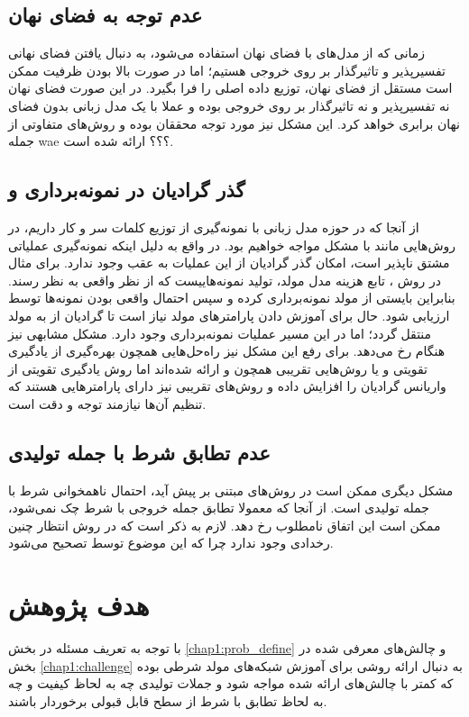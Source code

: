  \subsection{عدم توجه به فضای نهان}
 زمانی که از مدل‌های با فضای نهان استفاده می‌شود، به دنبال یافتن فضای نهانی تفسیرپذیر و تاثیرگذار بر روی خروجی \decoder{} هستیم؛ اما در صورت بالا بودن ظرفیت \decoder{} ممکن است مستقل از فضای نهان، توزیع داده اصلی را فرا بگیرد. در این صورت فضای نهان نه تفسیرپذیر و نه تاثیرگذار بر روی خروجی \decoder{} بوده و عملا با یک مدل زبانی بدون فضای نهان برابری خواهد کرد. این مشکل نیز مورد توجه محققان بوده و روش‌های متفاوتی از جمله wae ؟؟؟ ارائه شده است.
 \subsection{گذر گرادیان در نمونه‌برداری و
     }
از آنجا که در حوزه مدل زبانی با نمونه‌گیری از توزیع کلمات سر و کار داریم، در روش‌هایی مانند \gan{} با مشکل مواجه خواهیم بود. در واقع به دلیل اینکه نمونه‌گیری عملیاتی مشتق نا‌پذیر است، امکان گذر گرادیان از این عملیات به عقب وجود ندارد. برای مثال در روش \gan{}، تابع هزینه مدل مولد، تولید نمونه‌هاییست که از نظر \discriminator{} واقعی به نظر رسند. بنابراین بایستی از مولد نمونه‌برداری کرده و سپس احتمال واقعی بودن نمونه‌ها توسط \discriminator{} ارزیابی شود. حال برای آموزش دادن پارامتر‌های مولد نیاز است تا گرادیان از \discriminator{} به مولد منتقل گردد؛ اما در این مسیر عملیات نمونه‌برداری وجود دارد. مشکل مشابهی نیز هنگام \argmaxphrase{} رخ می‌دهد. برای رفع این مشکل نیز راه‌حل‌هایی همچون بهره‌گیری از یادگیری تقویتی و یا روش‌هایی تقریبی همچون  و  ارائه شده‌اند اما روش یادگیری تقویتی از واریانس گرادیان را افزایش داده و روش‌های تقریبی نیز دارای پارامتر‌هایی هستند که تنظیم آن‌ها نیازمند توجه و دقت است.
\subsection{عدم تطابق شرط با جمله تولیدی}
مشکل دیگری ممکن است در روش‌های مبتنی بر \likelihood{} پیش آید، احتمال ناهمخوانی شرط با جمله تولیدی است. از آنجا که معمولا تطابق جمله خروجی با شرط چک نمی‌شود، ممکن است این اتفاق نامطلوب رخ دهد. لازم به ذکر است که در روش \gan{} انتظار چنین رخدادی وجود ندارد چرا که این موضوع توسط \discriminator{} تصحیح می‌شود.
\section{هدف پژوهش}
با توجه به تعریف مسئله در بخش \ref{chap1:prob_define} و چالش‌های معرفی شده در بخش \ref{chap1:challenge} به دنبال ارائه روشی برای آموزش شبکه‌های مولد شرطی بوده که کمتر با چالش‌های ارائه شده مواجه شود و جملات تولیدی چه به لحاظ کیفیت و چه به لحاظ تطابق با شرط از سطح قابل قبولی برخوردار باشند.

